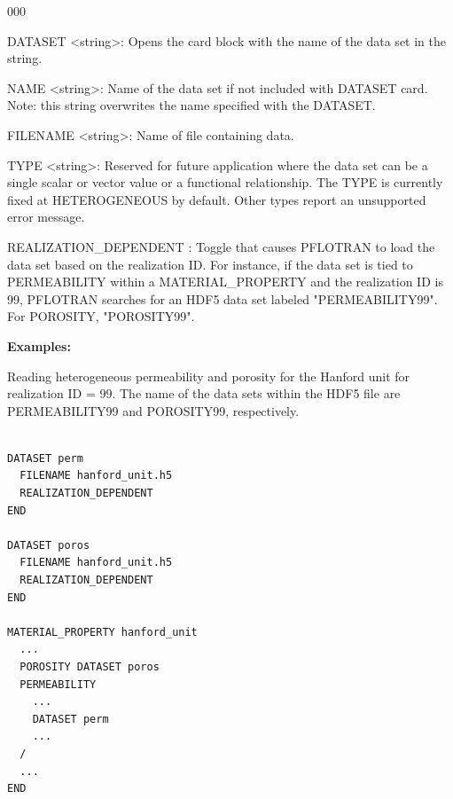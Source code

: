 

\begin{deflist}{000}
\item[DATASET] <string>: Opens the card block with the name of the data set in the string.

\item[NAME] <string>: Name of the data set if not included with DATASET card. Note: this string overwrites the name specified with the DATASET.

\item[FILENAME] <string>: Name of file containing data.

\item[TYPE] <string>: Reserved for future application where the data set can be a single scalar or vector value or a functional relationship. The TYPE is currently fixed at HETEROGENEOUS by default. Other types report an unsupported error message.

\item[REALIZATION\_DEPENDENT]: Toggle that causes PFLOTRAN to load the data set based on the realization ID. For instance, if the data set is tied to PERMEABILITY within a MATERIAL\_PROPERTY and the realization ID is 99, PFLOTRAN searches for an HDF5 data set labeled "PERMEABILITY99". For POROSITY, "POROSITY99".

\end{deflist}

\begin{mdframed}

\noindent
{\bf Examples:}

Reading heterogeneous permeability and porosity for the Hanford unit for realization ID = 99. The name of the data sets within the HDF5 file are PERMEABILITY99 and POROSITY99, respectively.

\footnotesize
\begin{verbatim}

DATASET perm
  FILENAME hanford_unit.h5
  REALIZATION_DEPENDENT
END

DATASET poros
  FILENAME hanford_unit.h5
  REALIZATION_DEPENDENT
END

MATERIAL_PROPERTY hanford_unit
  ...
  POROSITY DATASET poros
  PERMEABILITY 
    ...
    DATASET perm
    ...
  /
  ...
END
\end{verbatim}
\normalsize
\end{mdframed}

\hyperlink{target_key}{\return}

